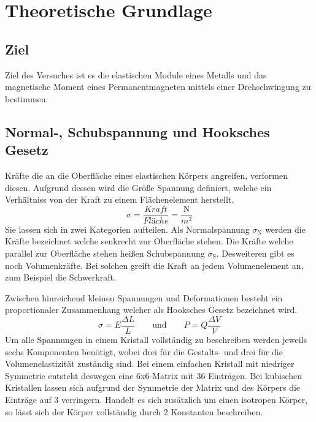 \section{Theoretische Grundlage}
\label{sec:Theorie}
\subsection{Ziel}
Ziel des Versuches ist es die elastischen Module eines Metalls und das magnetische Moment eines Permanentmagneten mittels einer Drehschwingung zu bestimmen.
\subsection{Normal-, Schubspannung und Hooksches Gesetz}
Kräfte die an die Oberfläche eines elastischen Körpers angreifen, verformen diesen. Aufgrund dessen wird die Größe Spannung definiert, welche ein Verhältniss von der Kraft zu einem Flächenelement herstellt.
\begin{equation}
  \sigma = \frac{Kraft}{Fläche} = \frac{\text{N}}{m^2}
  \label{eqn:Spannung}
\end{equation}
Sie lassen sich in zwei Kategorien aufteilen. Als Normalspannung $\sigma_\text{N}$ werden die Kräfte bezeichnet welche senkrecht zur Oberfläche stehen. Die Kräfte welche parallel zur Oberfläche stehen heißen Schubspannung $\sigma_\text{S}$. Desweiteren gibt es noch Volumenkräfte. Bei solchen greift die Kraft an jedem Volumenelement an, zum Beispiel die Schwerkraft.

Zwischen hinreichend kleinen Spannungen und Deformationen besteht ein proportionaler Zusammenhang welcher als Hooksches Gesetz bezeichnet wird.
\begin{equation}
  \sigma = E \frac{\Delta L}{L}  \hspace{2em} \text{und} \hspace{2em} P = Q\frac{\Delta V}{V}
  \label{eqn:Hook}
\end{equation}
Um alle Spannungen in einem Kristall vollständig zu beschreiben werden jeweils sechs Komponenten benötigt, wobei drei für die Gestalts- und drei für die Volumenelastizität zuständig sind. Bei einem einfachen  Kristall mit niedriger Symmetrie entsteht deswegen eine 6x6-Matrix mit 36 Einträgen. Bei kubischen Kristallen lassen sich aufgrund der Symmetrie der Matrix und des Körpers die Einträge auf 3 verringern. Handelt es sich zusätzlich um einen isotropen Körper, so lässt sich der Körper vollständig durch 2 Konstanten beschreiben.

